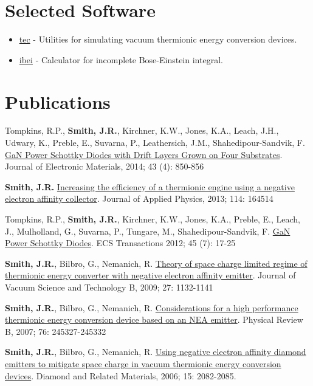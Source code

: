 \section{Selected Software}

\begin{itemize}
\item
  \href{http://jrsmith3.github.io/tec/}{tec} - Utilities for simulating
  vacuum thermionic energy conversion devices.
\item
  \href{http://ibei.readthedocs.org/en/latest/}{ibei} - Calculator for
  incomplete Bose-Einstein integral.
\end{itemize}

\section{Publications}

Tompkins, R.P., \textbf{Smith, J.R.}, Kirchner, K.W., Jones, K.A.,
Leach, J.H., Udwary, K., Preble, E., Suvarna, P., Leathersich, J.M.,
Shahedipour-Sandvik, F.
\href{http://dx.doi.org/10.1007/s11664-014-3021-9}{GaN Power Schottky
Diodes with Drift Layers Grown on Four Substrates}. Journal of
Electronic Materials, 2014; 43 (4): 850-856

\textbf{Smith, J.R.}
\href{http://dx.doi.org/10.1063/1.4826202}{Increasing the efficiency of
a thermionic engine using a negative electron affinity collector}.
Journal of Applied Physics, 2013; 114: 164514

Tompkins, R.P., \textbf{Smith, J.R.}, Kirchner, K.W., Jones, K.A.,
Preble, E., Leach, J., Mulholland, G., Suvarna, P., Tungare, M.,
Shahedipour-Sandvik, F. \href{http://dx.doi.org/10.1149/1.3701521}{GaN
Power Schottky Diodes}. ECS Transactions 2012; 45 (7): 17-25

\textbf{Smith, J.R.}, Bilbro, G., Nemanich, R.
\href{http://dx.doi.org/10.1116/1.3125282}{Theory of space charge
limited regime of thermionic energy converter with negative electron
affinity emitter}. Journal of Vacuum Science and Technology B, 2009; 27:
1132-1141

\textbf{Smith, J.R.}, Bilbro, G., Nemanich, R.
\href{http://dx.doi.org/10.1103/PhysRevB.76.245327}{Considerations for a
high performance thermionic energy conversion device based on an NEA
emitter}. Physical Review B, 2007; 76: 245327-245332

\textbf{Smith, J.R.}, Bilbro, G., Nemanich, R.
\href{http://dx.doi.org/10.1016/j.diamond.2006.09.011}{Using negative
electron affinity diamond emitters to mitigate space charge in vacuum
thermionic energy conversion devices}. Diamond and Related Materials,
2006; 15: 2082-2085.

